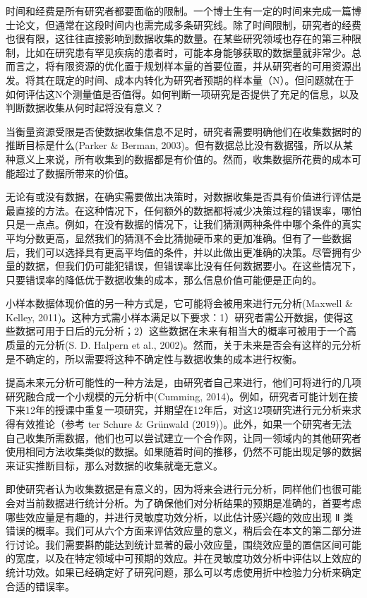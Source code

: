 \documentclass[
  letterpaper,
  DIV=11,
  numbers=noendperiod]{scrreprt}
\begin{document}
时间和经费是所有研究者都要面临的限制。一个博士生有一定的时间来完成一篇博士论文，但通常在这段时间内也需完成多条研究线。除了时间限制，研究者的经费也很有限，这往往直接影响到数据收集的数量。在某些研究领域也存在的第三种限制，比如在研究患有罕见疾病的患者时，可能本身能够获取的数据量就非常少。总而言之，将有限资源的优化置于规划样本量的首要位置，并从研究者的可用资源出发。将其在既定的时间、成本内转化为研究者预期的样本量（N）。但问题就在于如何评估这N个测量值是否值得。如何判断一项研究是否提供了充足的信息，以及判断数据收集从何时起将没有意义？

当衡量资源受限是否使数据收集信息不足时，研究者需要明确他们在收集数据时的推断目标是什么(Parker
\& Berman,
2003)。但有数据总比没有数据强，所以从某种意义上来说，所有收集到的数据都是有价值的。然而，收集数据所花费的成本可能超过了数据所带来的价值。

无论有或没有数据，在确实需要做出决策时，对数据收集是否具有价值进行评估是最直接的方法。在这种情况下，任何额外的数据都将减少决策过程的错误率，哪怕只是一点点。例如，在没有数据的情况下，让我们猜测两种条件中哪个条件的真实平均分数更高，显然我们的猜测不会比猜抛硬币来的更加准确。但有了一些数据后，我们可以选择具有更高平均值的条件，并以此做出更准确的决策。尽管拥有少量的数据，但我们仍可能犯错误，但错误率比没有任何数据要小。在这些情况下，只要错误率的降低优于数据收集的成本，那么信息价值可能便是正向的。

小样本数据体现价值的另一种方式是，它可能将会被用来进行元分析(Maxwell \&
Kelley,
2011)。这种方式需小样本满足以下要求：1）研究者需公开数据，使得这些数据可用于日后的元分析；2）这些数据在未来有相当大的概率可被用于一个高质量的元分析(S.
D. Halpern et al.,
2002)。然而，关于未来是否会有这样的元分析是不确定的，所以需要将这种不确定性与数据收集的成本进行权衡。

提高未来元分析可能性的一种方法是，由研究者自己来进行，他们可将进行的几项研究融合成一个小规模的元分析中(Cumming,
2014)。例如，研究者可能计划在接下来12年的授课中重复一项研究，并期望在12年后，对这12项研究进行元分析来求得有效推论（参考
ter Schure \& Grünwald
(2019))。此外，如果一个研究者无法自己收集所需数据，他们也可以尝试建立一个合作网，让同一领域内的其他研究者使用相同方法收集类似的数据。如果随着时间的推移，仍然不可能出现足够的数据来证实推断目标，那么对数据的收集就毫无意义。

即使研究者认为收集数据是有意义的，因为将来会进行元分析，同样他们也很可能会对当前数据进行统计分析。为了确保他们对分析结果的预期是准确的，首要考虑哪些效应量是有趣的，并进行灵敏度功效分析，以此估计感兴趣的效应出现
Ⅱ
类错误的概率。我们可从六个方面来评估效应量的意义，稍后会在本文的第二部分进行讨论。我们需要斟酌能达到统计显著的最小效应量，围绕效应量的置信区间可能的宽度，以及在特定领域中可预期的效应。并在灵敏度功效分析中评估以上效应的统计功效。如果已经确定好了研究问题，那么可以考虑使用折中检验力分析来确定合适的错误率。
\end{document}
